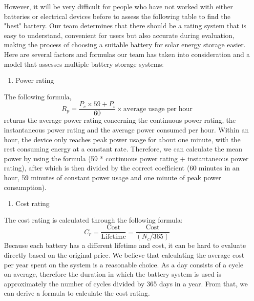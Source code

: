 However, it will be very difficult for people who have not worked with either batteries or electrical devices before to assess the following table to find the "best" battery. Our team determines that there should be a rating system that is easy to understand, convenient for users but also accurate during evaluation, making the process of choosing a suitable battery for solar energy storage easier. Here are several factors\cite{solar:guide} and formulas our team has taken into consideration and a model that assesses multiple battery storage systems:

\begin{enumerate}
    \item Power rating
\end{enumerate}
The following formula,
\begin{equation}
    R_p = \frac{P_c \times 59 + P_i}{60} \times \text{average usage per hour}
    \label{eq:-2}
\end{equation}
returns the average power rating concerning the continuous power rating, the instantaneous power rating and the average power consumed per hour. Within an hour, the device only reaches peak power usage for about one minute, with the rest consuming energy at a constant rate. Therefore, we can calculate the mean power by using the formula (59 * continuous power rating + instantaneous power rating), after which is then divided by the correct coefficient (60 minutes in an hour, 59 minutes of constant power usage and one minute of peak power consumption).

\begin{enumerate}[resume]
    \item Cost rating
\end{enumerate}
The cost rating is calculated through the following formula:
\begin{equation}
    C_r = \frac{\text{Cost}}{\text{Lifetime}} = \frac{\text{Cost}}{(N_c / 365)}
    \label{eq:-1}
\end{equation}
Because each battery has a different lifetime and cost, it can be hard to evaluate directly based on the original price. We believe that calculating the average cost per year spent on the system is a reasonable choice. As a day consists of a cycle on average, therefore the duration in which the battery system is used is approximately the number of cycles divided by 365 days in a year. From that, we can derive a formula to calculate the cost rating.

